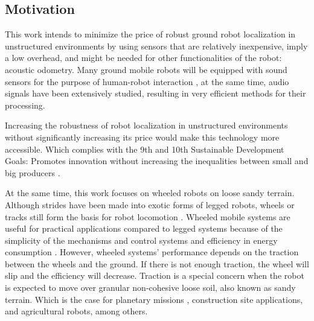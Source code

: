 \subsection{Motivation} \label{subsec:motivation}

This work intends to minimize the price of robust ground robot localization in
unstructured environments by using sensors that are relatively inexpensive,
imply a low overhead, and might be needed for other functionalities of the
robot: acoustic odometry. Many ground mobile robots will be equipped with sound
sensors for the purpose of human-robot interaction \cite{VoiceForklift}, at the
same time, audio signals have been extensively studied, resulting in very
efficient methods for their processing.

Increasing the robustness of robot localization in unstructured environments
without significantly increasing its price would make this technology more
accessible. Which complies with the 9th and 10th Sustainable Development Goals:
Promotes innovation without increasing the inequalities between small and big
producers \cite{SDG}.

At the same time, this work focuses on wheeled robots on loose sandy terrain.
Although strides have been made into exotic forms of legged robots, wheels or
tracks still form the basis for robot locomotion \cite{Sanchez09}. Wheeled
mobile systems are useful for practical applications compared to legged systems
because of the simplicity of the mechanisms and control systems and efficiency
in energy consumption \cite{Masayoshi2006}. However, wheeled systems'
performance depends on the traction between the wheels and the ground. If there
is not enough traction, the wheel will slip and the efficiency will decrease.
Traction is a special concern when the robot is expected to move over granular
non-cohesive loose soil, also known as sandy terrain. Which is the case for
planetary missions \cite{Amar2007}, construction site applications, and
agricultural robots, among others.